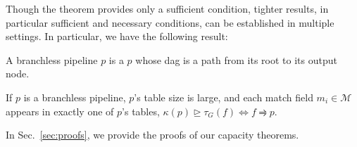  Though the theorem provides only a sufficient condition, tighter results, in particular sufficient and necessary conditions, can be established in multiple settings. In particular, we have the following result:

\begin{definition} A branchless pipeline $p$ is a $p$ whose dag is a path from its root to its output node.
\end{definition}

\begin{theorem} If $p$ is a branchless pipeline, $p$'s table size is large, and each match field $m_i \in \mathcal{M}$ appears in exactly one of $p$'s tables, $\kappa(p) \trianglerighteq \tau_G(f) \Leftrightarrow f \rightrightharpoons p$.
\end{theorem}


In Sec.~\ref{sec:proofs}, we provide the proofs of our capacity theorems.



